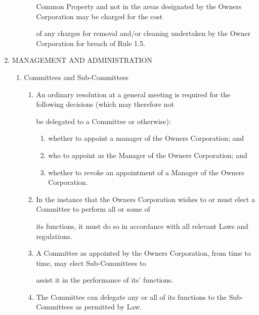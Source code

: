 \documentclass{article}
\begin{document}
\begin{enumerate}[label=\arabic*.]
\begin{enumerate}[label=\arabic{enumi}.\arabic*.]
\begin{enumerate}[label=(\arabic*)]
{\fontsize{10.02}{1}Common Property and not in the areas designated by the Owners Corporation may be charged for the cost }

{\fontsize{10.02}{1}of any charges for removal and/or cleaning undertaken by the Owner Corporation for breach of Rule 1.5. }

\newpage

\end{enumerate}
\end{enumerate}
\item {\fontsize{9.99}{1} MANAGEMENT AND ADMINISTRATION }

\begin{enumerate}[label=\arabic{enumi}.\arabic*.]
\item {\fontsize{9.99}{1} Committees and Sub-Committees }

\begin{enumerate}[label=(\arabic*)]
\item {\fontsize{9.962}{1} An ordinary resolution at a general meeting is required for the following decisions (which may therefore not }

{\fontsize{10.02}{1}be delegated to a Committee or otherwise): }

\begin{enumerate}[label=(\alph*)]
\item {\fontsize{9.962}{1} whether to appoint a manager of the Owners Corporation; and }

\item {\fontsize{9.962}{1} who to appoint as the Manager of the Owners Corporation; and }

\item {\fontsize{9.962}{1} whether to revoke an appointment of a Manager of the Owners Corporation. }

\end{enumerate}
\item {\fontsize{9.962}{1} In the instance that the Owners Corporation wishes to or must elect a Committee to perform all or some of }

{\fontsize{10.02}{1}its functions, it must do so in accordance with all relevant Laws and regulations. }

\item {\fontsize{9.962}{1} A Committee as appointed by the Owners Corporation, from time to time, may elect Sub-Committees to }

{\fontsize{10.02}{1}assist it in the performance of its’ functions. }

\item {\fontsize{9.962}{1} The Committee can delegate any or all of its functions to the Sub-Committees as permitted by Law. }


\end{enumerate}
\end{enumerate}
\end{enumerate}
\end{document}
